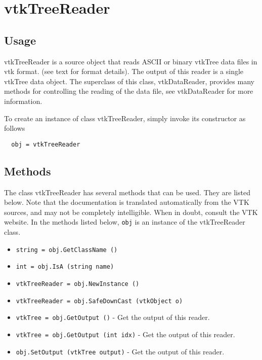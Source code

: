 \section{vtkTreeReader}

\subsection{Usage}

 vtkTreeReader is a source object that reads ASCII or binary 
 vtkTree data files in vtk format. (see text for format details).
 The output of this reader is a single vtkTree data object.
 The superclass of this class, vtkDataReader, provides many methods for
 controlling the reading of the data file, see vtkDataReader for more
 information.

To create an instance of class vtkTreeReader, simply
invoke its constructor as follows
\begin{verbatim}
  obj = vtkTreeReader
\end{verbatim}
\subsection{Methods}

The class vtkTreeReader has several methods that can be used.
  They are listed below.
Note that the documentation is translated automatically from the VTK sources,
and may not be completely intelligible.  When in doubt, consult the VTK website.
In the methods listed below, \verb|obj| is an instance of the vtkTreeReader class.
\begin{itemize}
\item  \verb|string = obj.GetClassName ()|

\item  \verb|int = obj.IsA (string name)|

\item  \verb|vtkTreeReader = obj.NewInstance ()|

\item  \verb|vtkTreeReader = obj.SafeDownCast (vtkObject o)|

\item  \verb|vtkTree = obj.GetOutput ()| -  Get the output of this reader.

\item  \verb|vtkTree = obj.GetOutput (int idx)| -  Get the output of this reader.

\item  \verb|obj.SetOutput (vtkTree output)| -  Get the output of this reader.

\end{itemize}
